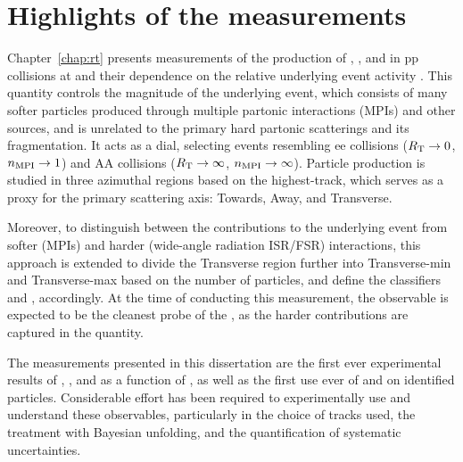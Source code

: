 \section{Highlights of the \RT measurements}

Chapter~\ref{chap:rt} presents measurements of the production of \KOs, \LA, and \AL in pp collisions at  and their dependence on the relative underlying event activity \RT. This quantity controls the magnitude of the underlying event, which consists of many softer particles produced through multiple partonic interactions (MPIs) and other sources, and is unrelated to the primary hard partonic scatterings and its fragmentation. It acts as a dial, selecting events resembling ee collisions ($R_{\rm T}\to0$, $n_{\rm MPI}\to1$) and AA collisions ($R_{\rm T}\to\infty$, $n_{\rm MPI}\to\infty$). Particle production is studied in three azimuthal regions based on the highest-\pt track, which serves as a proxy for the primary scattering axis: Towards, Away, and Transverse.

Moreover, to distinguish between the contributions to the underlying event from softer (MPIs) and harder (wide-angle radiation ISR/FSR) interactions, this approach is extended to divide the Transverse region further into Transverse-min and Transverse-max based on the number of particles, and define the classifiers \RTmin and \RTmax, accordingly. At the time of conducting this measurement, the \RTmin observable is expected to be the cleanest probe of the \meannmpi, as the harder contributions are captured in the \RTmax quantity.

The measurements presented in this dissertation are the first ever experimental results of \KOs, \LA, and \AL as a function of \RT, as well as the first use ever of \RTmin and \RTmax on identified particles. Considerable effort has been required to experimentally use and understand these observables, particularly in the choice of tracks used, the treatment with Bayesian unfolding, and the quantification of systematic uncertainties.

